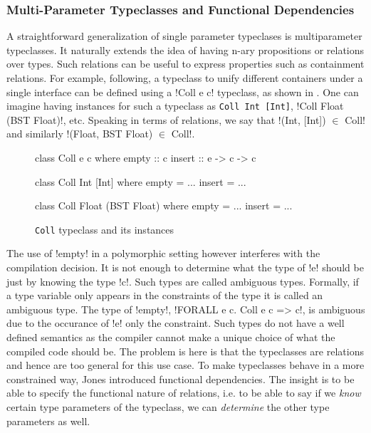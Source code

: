 \documentclass[manuscript,screen,nonacm]{acmart}
\begin{document}
\subsubsection{Multi-Parameter Typeclasses and Functional Dependencies}
A straightforward generalization of single parameter typeclases is multiparameter typeclasses. It naturally extends the idea of having n-ary propositions or relations over types. Such relations can be useful to express properties such as containment relations. For example, following\cite{jones_tcfd_2000}, a typeclass to unify different containers under a single interface can be defined using a !Coll e c! typeclass, as shown in . One can imagine having instances for such a typeclass as \lstinline{Coll Int [Int]}, !Coll Float (BST Float)!, etc. Speaking in terms of relations, we say that !(Int, [Int]) $\in$ Coll! and similarly !(Float, BST Float) $\in$ Coll!.

\begin{figure}[ht]
  \centering
  \begin{minipage}[ht]{0.3\linewidth}
    \begin{code}
      class Coll e c
      where
         empty :: c
         insert :: e -> c -> c
    \end{code}
  \end{minipage}%
  \begin{minipage}[ht]{0.3\linewidth}
    \begin{code}
      class Coll Int [Int]
      where
         empty = ...
         insert = ...
    \end{code}
  \end{minipage}%
  \begin{minipage}[ht]{0.3\linewidth}
    \begin{code}
      class Coll Float (BST Float)
      where
         empty = ...
         insert = ...
    \end{code}
  \end{minipage}
  \caption[Coll typeclass]{\lstinline{Coll} typeclass and its instances}
  \label{fig:tc-collection}
\end{figure}

The use of !empty! in a polymorphic setting however interferes with the compilation decision. It is not enough to determine what the type of !e! should be just by knowing the type !c!. Such types are called ambiguous types. Formally, if a type variable only appears in the constraints of the type it is called an ambiguous type. The type of !empty!, !FORALL e c. Coll e c => c!, is ambiguous due to the occurance of !e! only the constraint. Such types do not have a well defined semantics as the compiler cannot make a unique choice of what the compiled code should be. The problem is here is that the typeclasses are relations and hence are too general for this use case. To make typeclasses behave in a more constrained way, Jones introduced functional dependencies\cite{jones_tcfd_2000}. The insight is to be able to specify the functional nature of relations, i.e. to be able to say if we \emph{know} certain type parameters of the typeclass, we can \emph{determine} the other type parameters as well.
\end{document}
